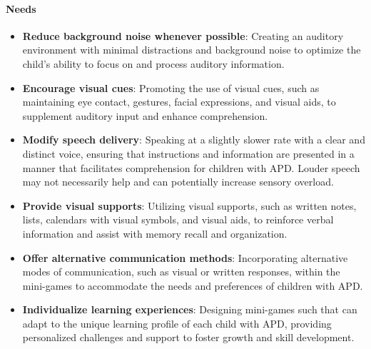 \paragraph{Needs}
\begin{itemize}
    \item \textbf{Reduce background noise whenever possible}: Creating an auditory environment with minimal distractions and background noise to optimize the child's ability to focus on and process auditory information.
    \item \textbf{Encourage visual cues}: Promoting the use of visual cues, such as maintaining eye contact, gestures, facial expressions, and visual aids, to supplement auditory input and enhance comprehension.
    \item \textbf{Modify speech delivery}: Speaking at a slightly slower rate with a clear and distinct voice, ensuring that instructions and information are presented in a manner that facilitates comprehension for children with APD. Louder speech may not necessarily help and can potentially increase sensory overload.
    \item \textbf{Provide visual supports}: Utilizing visual supports, such as written notes, lists, calendars with visual symbols, and visual aids, to reinforce verbal information and assist with memory recall and organization.
    \item \textbf{Offer alternative communication methods}: Incorporating alternative modes of communication, such as visual or written responses, within the mini-games to accommodate the needs and preferences of children with APD.
    \item \textbf{Individualize learning experiences}: Designing mini-games such that can adapt to the unique learning profile of each child with APD, providing personalized challenges and support to foster growth and skill development.
\end{itemize}
